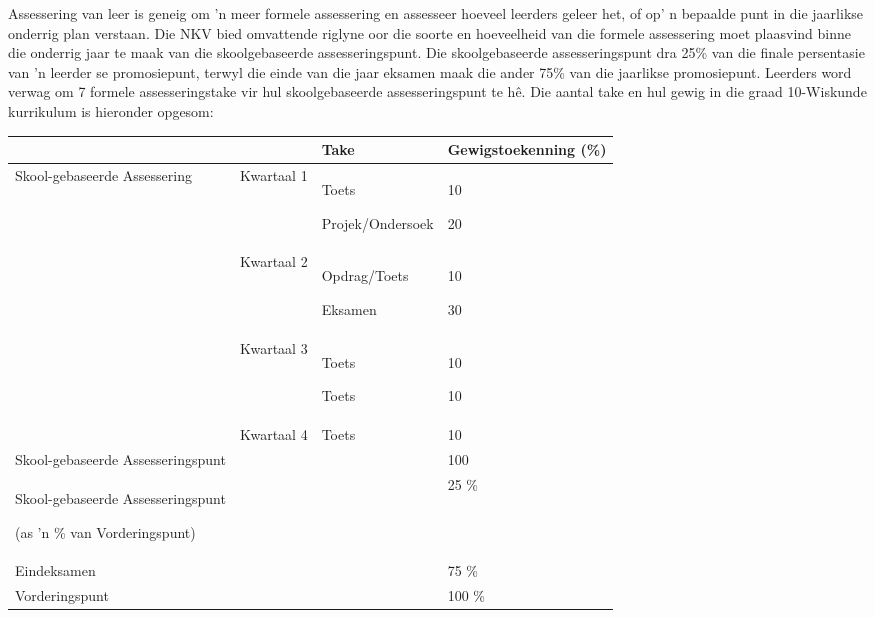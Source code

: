 Assessering van leer is geneig om 'n meer formele assessering en assesseer hoeveel leerders geleer het, of op' n bepaalde punt in die jaarlikse onderrig plan verstaan. Die NKV bied omvattende riglyne oor die soorte en hoeveelheid van die formele assessering moet plaasvind binne die onderrig jaar te maak van die skoolgebaseerde assesseringspunt. Die skoolgebaseerde assesseringspunt dra 25\% van die finale persentasie van 'n leerder se promosiepunt, terwyl die einde van die jaar eksamen maak die ander 75\% van die jaarlikse promosiepunt. Leerders word verwag om 7 formele assesseringstake vir hul skoolgebaseerde assesseringspunt te hê. Die aantal take en hul gewig in die graad 10-Wiskunde kurrikulum is hieronder opgesom:

\begin{table}[H]
\begin{center}
\begin{tabular} {|p{4.5cm}|p{1.5cm}|p{3cm}|p{2cm}|} \hline
	  & 			& \textbf{Take} 			& \textbf{Gewigstoekenning (\%)} \\ \hline
Skool-gebaseerde Assessering &
Kwartaal 1 &
Toets \par Projek/Ondersoek &
10 \par 20 \\ \hline
&
Kwartaal 2 &
Opdrag/Toets \par Eksamen &
10 \par 30 \\ \hline
&
Kwartaal 3 &
Toets \par Toets &
10 \par 10 \\ \hline
&
Kwartaal 4 & Toets &
10 \\ \hline
Skool-gebaseerde Assesseringspunt &
&
&
100 \\ \hline
Skool-gebaseerde Assesseringspunt  \par
(as 'n \% van Vorderingspunt)
			&	 & 					&  25 \% \\ \hline

Eindeksamen & 	& 					&75 \% \\ \hline
Vorderingspunt 		&       & 					& 100 \% \\ \hline


\end{tabular}
 \end{center}
\end{table}

